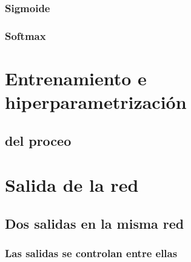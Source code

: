 \subsubsection{Sigmoide}
\subsubsection{Softmax}


\section{Entrenamiento e hiperparametrización}

\subsection{ del proceo}

\subsection{}

\subsection{}

\subsection{}


\section{Salida de la red}

\subsection{Dos salidas en la misma red}

\subsubsection{Las salidas se controlan entre ellas}


